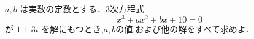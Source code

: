 \documentclass[8pt,dvipdfmx]{article}
\begin{document}
\begin{tcolorbox}[title=数学\textcircled{1} 3- 5 ABC]
\(a,b\) は実数の定数とする．3次方程式
\[
x^3 + ax^2 + bx + 10 = 0 
\]
が $1+3i$ を解にもつとき,\(a, b\)の値,および他の解をすべて求めよ．
\end{tcolorbox}
\end{document}
